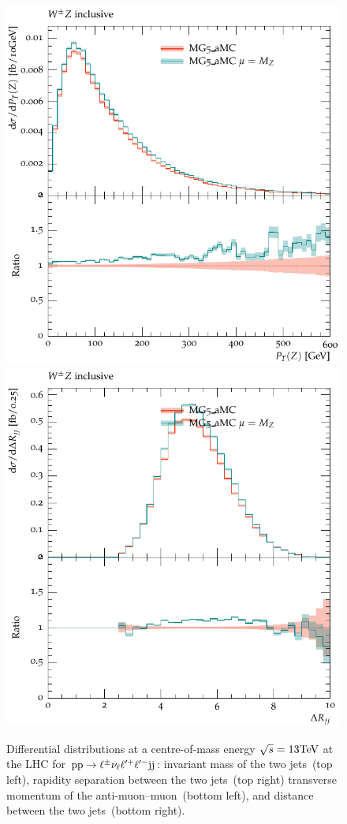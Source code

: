 \documentclass[11pt]{cernrep}
\begin{document}
\begin{figure}[htbp]
\begin{center}
   \includegraphics[scale=0.5]{figs/MG_ZPt}
   \includegraphics[scale=0.5]{figs/MG_dRjj}
\caption{Differential distributions at a centre-of-mass energy $\sqrt{s}=13{\rm TeV}$ at the LHC for ${\rm p} {\rm p} \to \ell^\pm  \nu_{\ell}  \ell^{\prime +} \ell^{\prime -}{\rm j} {\rm j}$: 
                invariant mass of the two jets~(top left),
                rapidity separation between the two jets~(top right)
                transverse momentum of the anti-muon--muon~(bottom left), and
                distance between the two jets~(bottom right).}
\label{vbs_fig_shower_3a}
\end{center}
\end{figure}
\end{document}
